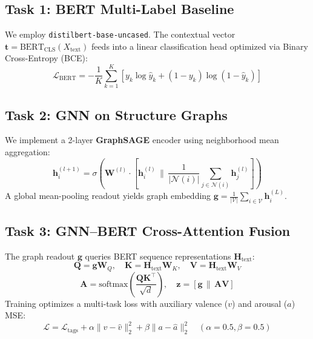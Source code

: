 \documentclass{article}
\begin{document}
\subsection{Task 1: BERT Multi-Label Baseline}
We employ \texttt{distilbert-base-uncased}. The contextual vector $\mathbf{t} = \text{BERT}_{\text{CLS}}(X_{\text{text}})$ feeds into a linear classification head optimized via Binary Cross-Entropy (BCE):
\begin{equation}
\mathcal{L}_{\text{BERT}} = -\frac{1}{K}\sum_{k=1}^K [y_k \log \hat{y}_k + (1-y_k)\log(1-\hat{y}_k)]
\end{equation}

\subsection{Task 2: GNN on Structure Graphs}
We implement a 2-layer \textbf{GraphSAGE} encoder using neighborhood mean aggregation:
\begin{equation}
\mathbf{h}_i^{(l+1)} = \sigma\left(\mathbf{W}^{(l)} \cdot \left[\mathbf{h}_i^{(l)} \,\|\, \frac{1}{|\mathcal{N}(i)|}\sum_{j \in \mathcal{N}(i)} \mathbf{h}_j^{(l)}\right]\right)
\end{equation}
A global mean-pooling readout yields graph embedding $\mathbf{g} = \frac{1}{|\mathcal{V}|} \sum_{i \in \mathcal{V}} \mathbf{h}_i^{(L)}$.

\subsection{Task 3: GNN--BERT Cross-Attention Fusion}
The graph readout $\mathbf{g}$ queries BERT sequence representations $\mathbf{H}_{\text{text}}$:
\begin{equation}
\mathbf{Q} = \mathbf{g}\mathbf{W}_Q, \quad \mathbf{K} = \mathbf{H}_{\text{text}}\mathbf{W}_K, \quad \mathbf{V} = \mathbf{H}_{\text{text}}\mathbf{W}_V
\end{equation}
\begin{equation}
\mathbf{A} = \text{softmax}\left(\frac{\mathbf{Q}\mathbf{K}^\top}{\sqrt{d}}\right), \quad \mathbf{z} = [\mathbf{g} \,\|\, \mathbf{A}\mathbf{V}]
\end{equation}
Training optimizes a multi-task loss with auxiliary valence ($v$) and arousal ($a$) MSE:
\begin{equation}
\mathcal{L} = \mathcal{L}_{\text{tags}} + \alpha \|v - \hat{v}\|_2^2 + \beta \|a - \hat{a}\|_2^2 \quad (\alpha=0.5, \beta=0.5)
\end{equation}
\end{document}
